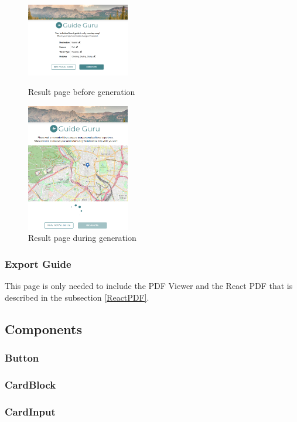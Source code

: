 \documentclass[english,notitlepage,smartquotes]{hgbreport}
\begin{document}
\begin{figure}
	\centering
	\includegraphics[width=0.4\textwidth]{ResultPage.png}
	\caption{Result page before generation}
	\includegraphics[width=0.4\textwidth]{ResultPageLoading.png}
	\caption{Result page during generation}
\end{figure}

\subsubsection{Export Guide}

This page is only needed to include the PDF Viewer and the React PDF that is described in the subsection \ref{ReactPDF}. 

\subsection{Components}

\subsubsection{Button}

\subsubsection{CardBlock} \label{CardBlockComponent}

\subsubsection{CardInput}
\end{document}
